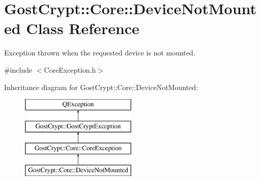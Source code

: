 \hypertarget{class_gost_crypt_1_1_core_1_1_device_not_mounted}{}\section{Gost\+Crypt\+:\+:Core\+:\+:Device\+Not\+Mounted Class Reference}
\label{class_gost_crypt_1_1_core_1_1_device_not_mounted}


Exception thrown when the requested device is not mounted.  




{\ttfamily \#include $<$Core\+Exception.\+h$>$}

Inheritance diagram for Gost\+Crypt\+:\+:Core\+:\+:Device\+Not\+Mounted\+:\begin{figure}[H]
\begin{center}
\leavevmode
\includegraphics[height=4.000000cm]{class_gost_crypt_1_1_core_1_1_device_not_mounted}
\end{center}
\end{figure}
